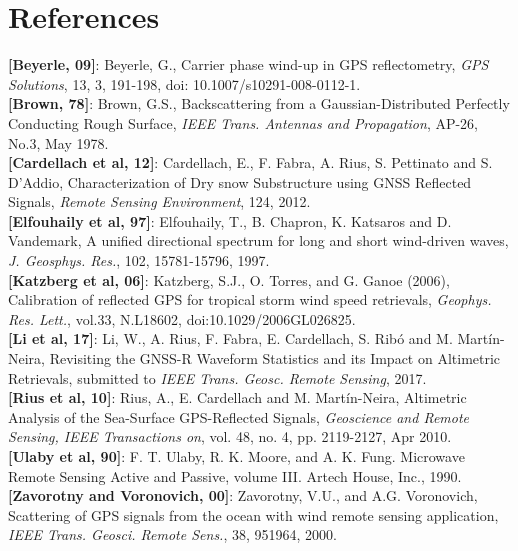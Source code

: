 \chapter*{References}


{\bf [Beyerle, 09]}: Beyerle, G., Carrier phase wind-up in GPS reflectometry, {\it GPS Solutions}, 13, 3, 191-198, doi: 10.1007/s10291-008-0112-1.\\

{\bf [Brown, 78]}: Brown, G.S., Backscattering from a Gaussian-Distributed Perfectly Conducting Rough Surface, {\it IEEE Trans. Antennas and Propagation}, AP-26, No.3, May 1978.\\

{\bf [Cardellach et al, 12]}: Cardellach, E., F. Fabra, A. Rius, S. Pettinato and S. D'Addio, Characterization of Dry snow Substructure using GNSS Reflected Signals, {\it Remote Sensing Environment}, 124, 2012.\\

{\bf [Elfouhaily et al, 97]}: Elfouhaily, T., B. Chapron, K. Katsaros and D. Vandemark, A unified directional spectrum for long and short wind-driven waves, {\it J. Geosphys. Res.}, 102, 15781-15796, 1997.\\

{\bf [Katzberg et al, 06]}: Katzberg, S.J., O. Torres, and G. Ganoe (2006), Calibration of reflected GPS for tropical storm wind speed retrievals, {\it Geophys. Res. Lett.}, vol.33, N.L18602, doi:10.1029/2006GL026825.\\

{\bf [Li et al, 17]}: Li, W., A. Rius, F. Fabra, E. Cardellach, S. Ribó and M. Martín-Neira, Revisiting the GNSS-R Waveform Statistics and its Impact on Altimetric Retrievals, submitted to {\it IEEE Trans. Geosc. Remote Sensing}, 2017.\\

{\bf [Rius et al, 10]}: Rius, A., E. Cardellach and M. Martín-Neira, Altimetric Analysis of the Sea-Surface GPS-Reflected
Signals, {\it Geoscience and Remote Sensing, IEEE Transactions on}, vol. 48, no. 4, pp. 2119-2127, Apr 2010.\\

{\bf [Ulaby et al, 90]}: F. T. Ulaby, R. K. Moore, and A. K. Fung. Microwave Remote Sensing Active and Passive, volume III. Artech House, Inc., 1990.\\

{\bf [Zavorotny and Voronovich, 00]}: Zavorotny, V.U., and A.G. Voronovich, Scattering of GPS signals from the ocean with wind remote sensing application, {\it IEEE Trans. Geosci. Remote Sens.}, 38, 951964, 2000.\\